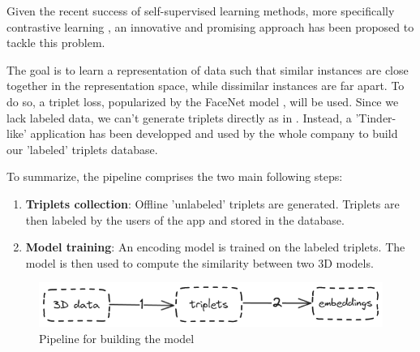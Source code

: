Given the recent success of self-supervised learning methods, more specifically contrastive learning \cite{radfordLearningTransferableVisual2021,yuPointBERTPretraining3D2022,liuOpenShapeScaling3D2023}, an innovative and promising approach has been proposed to tackle this problem.

The goal is to learn a representation of data such that similar instances are close together in the representation space, while dissimilar instances are far apart. To do so, a triplet loss, popularized by the FaceNet model \cite{schroffFaceNetUnifiedEmbedding2015}, will be used. Since we lack labeled data, we can't generate triplets directly as in \cite{schroffFaceNetUnifiedEmbedding2015}. Instead, a 'Tinder-like' application has been developped and used by the whole company to build our 'labeled' triplets database.

To summarize, the pipeline comprises the two main following steps:
\begin{enumerate}
    \item \textbf{Triplets collection}: Offline 'unlabeled' triplets are generated. Triplets are then labeled by the users of the app and stored in the database.
    \item \textbf{Model training}: An encoding model is trained on the labeled triplets. The model is then used to compute the similarity between two 3D models.
\end{enumerate}

\begin{figure}[]
    \centering
    \includegraphics[width=0.8\columnwidth]{images/steps.png}
    \caption{Pipeline for building the model}   
    \label{fig:steps}
\end{figure}